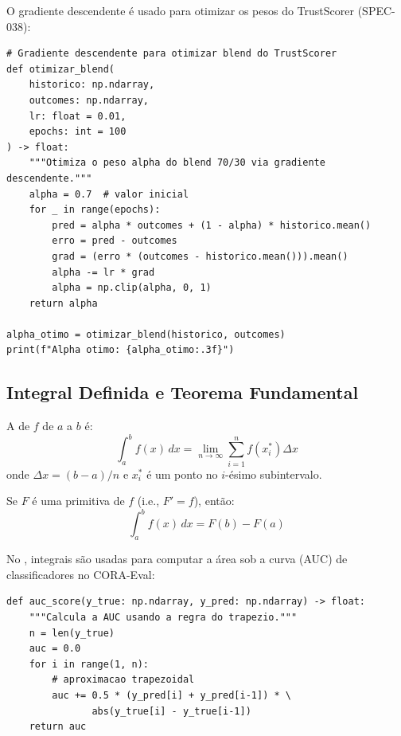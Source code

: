 \begin{exemplo}
    O gradiente descendente é usado para otimizar os pesos do TrustScorer
    (SPEC-038):
    \begin{lstlisting}[style=pythonstyle]
# Gradiente descendente para otimizar blend do TrustScorer
def otimizar_blend(
    historico: np.ndarray,
    outcomes: np.ndarray,
    lr: float = 0.01,
    epochs: int = 100
) -> float:
    """Otimiza o peso alpha do blend 70/30 via gradiente descendente."""
    alpha = 0.7  # valor inicial
    for _ in range(epochs):
        pred = alpha * outcomes + (1 - alpha) * historico.mean()
        erro = pred - outcomes
        grad = (erro * (outcomes - historico.mean())).mean()
        alpha -= lr * grad
        alpha = np.clip(alpha, 0, 1)
    return alpha

alpha_otimo = otimizar_blend(historico, outcomes)
print(f"Alpha otimo: {alpha_otimo:.3f}")
    \end{lstlisting}
\end{exemplo}

\subsection{Integral Definida e Teorema Fundamental}

\begin{definicao}
    A  de $f$ de $a$ a $b$ é:
    \[
    \int_a^b f(x) \, dx = \lim_{n \to \infty}
    \sum_{i=1}^{n} f(x_i^*) \Delta x
    \]
    onde $\Delta x = (b-a)/n$ e $x_i^*$ é um ponto no $i$-ésimo subintervalo.
\end{definicao}

\begin{teorema}
    Se $F$ é uma primitiva de $f$ (i.e., $F' = f$), então:
    \[
    \int_a^b f(x) \, dx = F(b) - F(a)
    \]
\end{teorema}

\begin{exemplo}
    No \opencodeeco{}, integrais são usadas para computar a área sob a curva
    (AUC) de classificadores no CORA-Eval:
    \begin{lstlisting}[style=pythonstyle]
def auc_score(y_true: np.ndarray, y_pred: np.ndarray) -> float:
    """Calcula a AUC usando a regra do trapezio."""
    n = len(y_true)
    auc = 0.0
    for i in range(1, n):
        # aproximacao trapezoidal
        auc += 0.5 * (y_pred[i] + y_pred[i-1]) * \
               abs(y_true[i] - y_true[i-1])
    return auc
    \end{lstlisting}
\end{exemplo}

